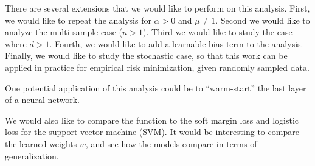 \documentclass[11pt]{article}
\begin{document}
There are several extensions that we would like to perform on this analysis. First, we would like to repeat the analysis for $\alpha > 0$ and $\mu \neq 1$. Second we would like to analyze the multi-sample case ($n > 1$). Third we would like to study the case where $d > 1$. Fourth, we would like to add a learnable bias term to the analysis. Finally, we would like to study the stochastic case, so that this work can be applied in practice for empirical risk minimization, given randomly sampled data.

One potential application of this analysis could be to ``warm-start'' the last layer of a neural network.

We would also like to compare the function to the soft margin loss and logistic loss for the support vector machine (SVM). It would be interesting to compare the learned weights $w$, and see how the models compare in terms of generalization.




\end{document}
